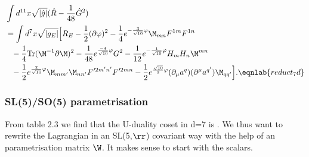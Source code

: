 \begin{align}
&\int d^{11}x \sqrt{|\hat{g}|} (\hat{R}-{1 \over 48}\hat{G}^2) \nonumber \\
&= \int d^7x \sqrt{|g_E|} \Big{[} R_E - {1 \over 2}(\partial \varphi)^2-{1 \over 4}e^{-{3 \over \sqrt{10}}\varphi}\M_{mn}F^{1m}F^{1n} \nonumber \\
&\phantom{=} -{1 \over 4}\mbox{Tr}(\M^{-1}\partial \M)^2 - {1 \over 48}e^{{-4 \over \sqrt{10}}\varphi}G^2 - {1 \over 12}e^{-{1 \over \sqrt{10}} \varphi}H_mH_n\M^{mn} \nonumber \\
&\phantom{=}- {1 \over 2}e^{{2 \over \sqrt{10}} \varphi}\M_{mm'}\M_{nn'}F'^{2m'n'}F'^{2mn} - {1 \over 2}e^{{\sqrt{10} \over 2} \varphi}({\partial}_{\mu} a^q)({\partial}^{\mu} a^{q'})\M_{qq'} \Big{]}.
\eqnlab{reduct_7d}
\end{align}


\subsubsection{SL(5)/SO(5) parametrisation}
From table 2.3 we find that the U-duality coset in d=7 is . We thus want to rewrite the Lagrangian  in an SL(5,$\rr$) covariant way with the help of an  parametrisation matrix $\W$. 
It makes sense to start with the scalars.

